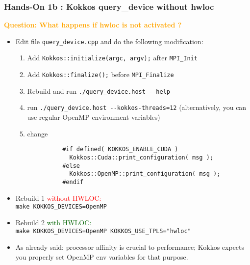   
\begin{frame}[fragile=singleslide]
  \frametitle{Hands-On 1b : Kokkos query\_device without hwloc}

  {\large\textcolor{orange}{\bf Question: What happens if hwloc is not activated ?}}

  \begin{itemize}
  \item Edit file \texttt{query\_device.cpp} and do the following modification:
    \begin{enumerate}
    \item Add \texttt{Kokkos::initialize(argc, argv);} after \texttt{MPI\_Init}
    \item Add \texttt{Kokkos::finalize();} before \texttt{MPI\_Finalize}
    \item Rebuild and run \texttt{./query\_device.host \--\--help}
    \item run \texttt{./query\_device.host \--\--kokkos-threads=12} (alternatively, you can use regular OpenMP environment variables)
    \item change\\
      {\small
        \begin{verbatim}
          #if defined( KOKKOS_ENABLE_CUDA )
            Kokkos::Cuda::print_configuration( msg );
          #else
            Kokkos::OpenMP::print_configuration( msg );
          #endif
        \end{verbatim}
      }
    \end{enumerate}
  \item {\small Rebuild 1 \textcolor{red}{without HWLOC:}\\
      \texttt{make KOKKOS\_DEVICES=OpenMP}}
  \item {\small Rebuild 2 \textcolor{darkgreen}{with HWLOC:}\\
      \texttt{make KOKKOS\_DEVICES=OpenMP KOKKOS\_USE\_TPLS="hwloc"}}
    \item As already said: processor affinity is crucial to performance; Kokkos expects you properly set OpenMP env variables for that purpose.
  \end{itemize}

\end{frame}
